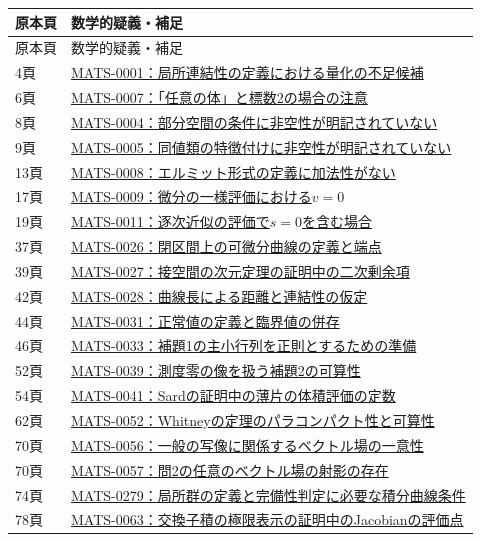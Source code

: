\documentclass[a4paper,10pt]{ltjsarticle}
\begin{document}
\small\begin{longtable}{@{}p{.14\linewidth}p{.82\linewidth}@{}}
\toprule 原本頁 & 数学的疑義・補足\\\midrule\endfirsthead
\toprule 原本頁 & 数学的疑義・補足\\\midrule\endhead
\bottomrule\endlastfoot
4頁 & \hyperref[math:MATS-0001]{MATS-0001：局所連結性の定義における量化の不足候補} \\
6頁 & \hyperref[math:MATS-0007]{MATS-0007：「任意の体」と標数2の場合の注意} \\
8頁 & \hyperref[math:MATS-0004]{MATS-0004：部分空間の条件に非空性が明記されていない} \\
9頁 & \hyperref[math:MATS-0005]{MATS-0005：同値類の特徴付けに非空性が明記されていない} \\
13頁 & \hyperref[math:MATS-0008]{MATS-0008：エルミット形式の定義に加法性がない} \\
17頁 & \hyperref[math:MATS-0009]{MATS-0009：微分の一様評価における$v=0$} \\
19頁 & \hyperref[math:MATS-0011]{MATS-0011：逐次近似の評価で$s=0$を含む場合} \\
37頁 & \hyperref[math:MATS-0026]{MATS-0026：閉区間上の可微分曲線の定義と端点} \\
39頁 & \hyperref[math:MATS-0027]{MATS-0027：接空間の次元定理の証明中の二次剰余項} \\
42頁 & \hyperref[math:MATS-0028]{MATS-0028：曲線長による距離と連結性の仮定} \\
44頁 & \hyperref[math:MATS-0031]{MATS-0031：正常値の定義と臨界値の併存} \\
46頁 & \hyperref[math:MATS-0033]{MATS-0033：補題1の主小行列を正則とするための準備} \\
52頁 & \hyperref[math:MATS-0039]{MATS-0039：測度零の像を扱う補題2の可算性} \\
54頁 & \hyperref[math:MATS-0041]{MATS-0041：Sardの証明中の薄片の体積評価の定数} \\
62頁 & \hyperref[math:MATS-0052]{MATS-0052：Whitneyの定理のパラコンパクト性と可算性} \\
70頁 & \hyperref[math:MATS-0056]{MATS-0056：一般の写像に関係するベクトル場の一意性} \\
70頁 & \hyperref[math:MATS-0057]{MATS-0057：問2の任意のベクトル場の射影の存在} \\
74頁 & \hyperref[math:MATS-0279]{MATS-0279：局所群の定義と完備性判定に必要な積分曲線条件} \\
78頁 & \hyperref[math:MATS-0063]{MATS-0063：交換子積の極限表示の証明中のJacobianの評価点} \\

\end{longtable}
\end{document}
